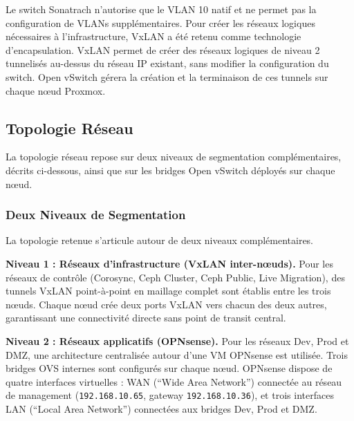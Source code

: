 \par Le switch Sonatrach n'autorise que le VLAN 10 natif et ne permet pas la configuration de VLANs supplémentaires. Pour créer les réseaux logiques nécessaires à l'infrastructure, VxLAN a été retenu comme technologie d'encapsulation. VxLAN permet de créer des réseaux logiques de niveau 2 tunnelisés au-dessus du réseau IP existant, sans modifier la configuration du switch. Open vSwitch gérera la création et la terminaison de ces tunnels sur chaque nœud Proxmox.\\

\subsection{Topologie Réseau}

\par La topologie réseau repose sur deux niveaux de segmentation complémentaires, décrits ci-dessous, ainsi que sur les bridges Open vSwitch déployés sur chaque nœud.\\

\subsubsection{Deux Niveaux de Segmentation}

\par La topologie retenue s'articule autour de deux niveaux complémentaires.\\

\par \textbf{Niveau 1 : Réseaux d'infrastructure (VxLAN inter-nœuds).} Pour les réseaux de contrôle (Corosync, Ceph Cluster, Ceph Public, Live Migration), des tunnels VxLAN point-à-point en maillage complet sont établis entre les trois nœuds. Chaque nœud crée deux ports VxLAN vers chacun des deux autres, garantissant une connectivité directe sans point de transit central.\\

\par \textbf{Niveau 2 : Réseaux applicatifs (OPNsense).} Pour les réseaux Dev, Prod et DMZ, une architecture centralisée autour d'une VM OPNsense est utilisée. Trois bridges OVS internes sont configurés sur chaque nœud. OPNsense dispose de quatre interfaces virtuelles : WAN (``Wide Area Network'') connectée au réseau de management (\texttt{192.168.10.65}, gateway \texttt{192.168.10.36}), et trois interfaces LAN (``Local Area Network'') connectées aux bridges Dev, Prod et DMZ.\\


